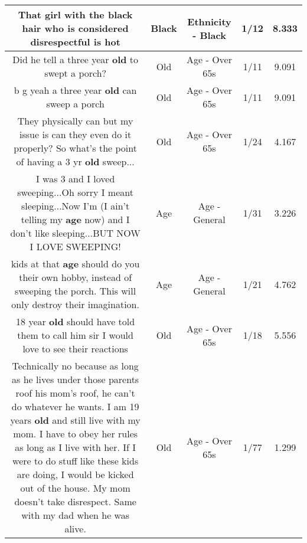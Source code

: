 \documentclass[11pt]{article}
\newlength\mylength
\begin{document}
\begin{center}
\begin{longtable}{|C{.65\mylength}|C{.30\mylength}|C{.12\mylength}|C{.12\mylength}|C{.12\mylength}|}
  \small That girl with the \textbf{black} hair who is considered disrespectful is hot\normalsize   & Black & Ethnicity - Black & 1/12 & 8.333 \\  \hline
  \small Did he tell a three year \textbf{old} to swept a porch?\normalsize   & Old & Age - Over 65s & 1/11 & 9.091 \\  \hline
  \small b g yeah a three year \textbf{old} can sweep a porch\normalsize   & Old & Age - Over 65s & 1/11 & 9.091 \\  \hline
  \small They physically can but my issue is can they even do it properly? So what's the point of having a 3 yr \textbf{old} sweep...\normalsize   & Old & Age - Over 65s & 1/24 & 4.167 \\  \hline
  \small I was 3 and I loved sweeping...Oh sorry I meant sleeping...Now I'm  (I ain't telling my \textbf{age} now) and I don't like sleeping...BUT NOW I LOVE SWEEPING!\normalsize   & Age & Age - General & 1/31 & 3.226 \\  \hline
  \small kids at that \textbf{age} should do you their own hobby, instead of sweeping the porch. This will only destroy their imagination.\normalsize   & Age & Age - General & 1/21 & 4.762 \\  \hline
  \small 18 year \textbf{old} should have told them to call him sir I would love to see their reactions\normalsize   & Old & Age - Over 65s & 1/18 & 5.556 \\  \hline
  \small Technically no because as long as he lives under those parents roof his mom's roof, he can't do whatever he wants. I am 19 years \textbf{old} and still live with my mom. I have to obey her rules as long as I live with her. If I were to do stuff like these kids are doing, I would be kicked out of the house. My mom doesn't take disrespect. Same with my dad when he was alive.\normalsize   & Old & Age - Over 65s & 1/77 & 1.299 \\  \hline

\end{longtable}
\end{center}
\end{document}
